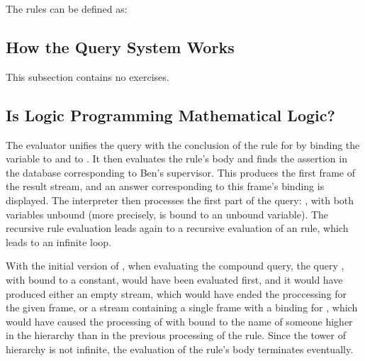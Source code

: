 \begin{exe}[4.63]
    The rules can be defined as:
\end{exe}

\subsection{How the Query System Works}

This subsection contains no exercises.

\subsection{Is Logic Programming Mathematical Logic?}

\begin{exe}[4.64]
    The evaluator unifies the query with the conclusion of the rule for 
     by binding the variable  to 
     and  to . It then evaluates 
    the rule’s body and finds the assertion in the database corresponding to 
    Ben’s supervisor. This produces the first frame of the result stream, and an 
    answer corresponding to this frame’s binding is displayed. The interpreter 
    then processes the first part of the  query:
    , with both variables unbound 
    (more precisely,  is bound to an unbound variable). The 
    recursive rule evaluation leads again to a recursive evaluation of an 
     rule, which leads to an infinite loop.

    With the initial version of , when evaluating the 
    compound  query, the query
    , with  bound to 
    a constant, would have been evaluated first, and it would have produced 
    either an empty stream, which would have ended the proccessing for the given 
    frame, or a stream containing a single frame with a binding for 
    , which would have caused the processing of \linebreak
     with  bound to 
    the name of someone higher in the hierarchy than in the previous processing 
    of the rule. Since the tower of hierarchy is not infinite, the evaluation of 
    the rule’s body terminates eventually.
\end{exe}

